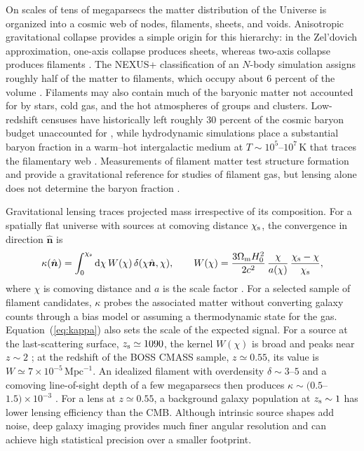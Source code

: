 \documentclass[preprint]{aastex701}
\begin{document}
On scales of tens of megaparsecs the matter distribution of the Universe is
organized into a cosmic web of nodes, filaments, sheets, and voids. Anisotropic
gravitational collapse provides a simple origin for this hierarchy: in the
Zel'dovich approximation, one-axis collapse produces sheets, whereas two-axis
collapse produces filaments
\citep{Zeldovich1970, BondKofmanPogosyan1996}.
The NEXUS+ classification of an $N$-body simulation assigns roughly half of
the matter to filaments, which occupy about 6 percent of the volume
\citep{Cautun2014}. Filaments may also contain much of the baryonic matter
not accounted for by stars, cold gas, and the hot atmospheres of groups and
clusters. Low-redshift censuses have historically left roughly 30 percent of
the cosmic baryon budget unaccounted for \citep{FukugitaHoganPeebles1998,
Shull2012}, while hydrodynamic simulations place a substantial baryon
fraction in a warm--hot intergalactic medium at
$T\sim10^{5}$--$10^{7}\,\mathrm{K}$ that traces the filamentary web
\citep{CenOstriker1999}. Measurements of filament matter test structure
formation and provide a gravitational reference for studies of filament gas,
but lensing alone does not determine the baryon fraction
\citep{deGraaff2019, Tanimura2020, Nicastro2018}.

Gravitational lensing traces projected mass irrespective of its composition.
For a spatially flat universe with sources at comoving distance $\chi_{\rm s}$,
the convergence in direction $\hat{\boldsymbol n}$ is
\begin{equation}
  \kappa(\hat{\boldsymbol n}) = \int_{0}^{\chi_{\rm s}} \mathrm{d}\chi\,
  W(\chi)\,\delta(\chi\hat{\boldsymbol n},\chi), \qquad
  W(\chi) = \frac{3\Omega_{\rm m}H_{0}^{2}}{2c^{2}}\,
  \frac{\chi}{a(\chi)}\,\frac{\chi_{\rm s}-\chi}{\chi_{\rm s}},
  \label{eq:kappa}
\end{equation}
where $\chi$ is comoving distance and $a$ is the scale factor
\citep{Bartelmann2001}. For a selected sample of filament candidates, $\kappa$
probes the associated matter without converting galaxy counts through a bias
model or assuming a thermodynamic state for the gas.
Equation~(\ref{eq:kappa}) also
sets the scale of the expected signal. For a source at the last-scattering
surface, $z_{\rm s}\simeq1090$, the kernel $W(\chi)$ is broad and peaks near
$z\sim2$ \citep{LewisChallinor2006}; at the redshift of the BOSS CMASS sample,
$z\simeq0.55$, its value is $W\simeq7\times10^{-5}\,\mathrm{Mpc}^{-1}$.
An idealized filament with overdensity $\delta\sim3$--$5$ and a comoving
line-of-sight depth of a few megaparsecs then produces
$\kappa\sim(0.5$--$1.5)\times10^{-3}$ \citep{Colberg2005}. For a lens at
$z\simeq0.55$, a
background galaxy population at $z_{\rm s}\sim1$ has lower lensing efficiency
than the CMB. Although intrinsic source shapes add noise, deep galaxy imaging
provides much finer angular resolution and can achieve high statistical
precision over a smaller footprint.
\end{document}
